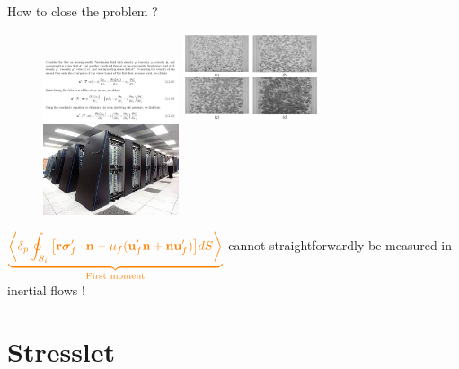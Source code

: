 \documentclass{sintefbeamer}
\begin{document}
\begin{frame}
  How to close the problem ?
\begin{figure}
  \includegraphics[width=4cm]{image/reciprocal}
  \includegraphics[width=4cm]{image/bubbles_2}
  \includegraphics[width=4cm]{image/HPC}
\end{figure}
$\textcolor{orange}{\underbrace{ {\left<\delta_p \oint_{S_{i}} {\left[\textbf{r}\bm{\sigma}_f' \cdot \textbf{n}-\mu_f(\textbf{u}_f'\textbf{n} +\textbf{n}\textbf{u}_f')\right]} dS\right>}}_\text{First moment} }$ cannot straightforwardly be measured in inertial flows ! 
\end{frame}




\section{Stresslet}
\section*{}
\end{document}
